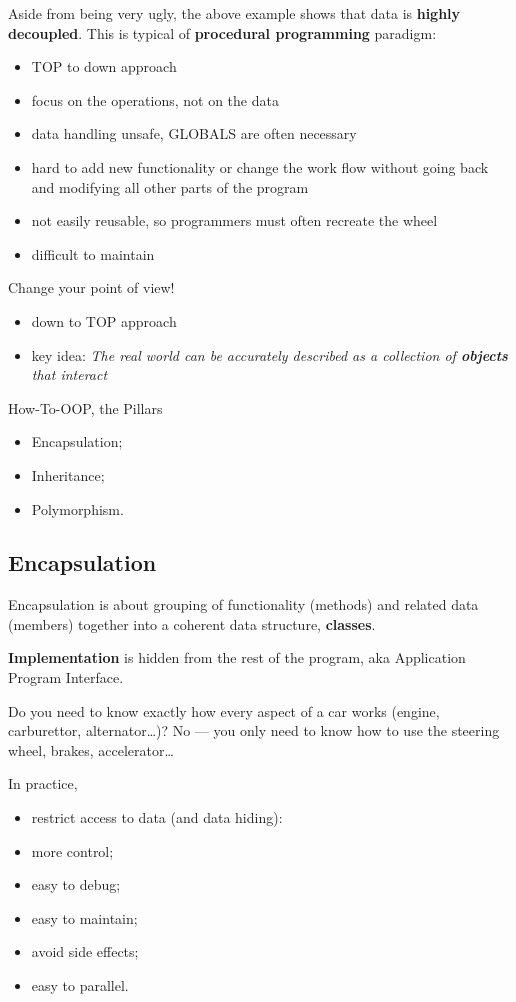 \documentclass[11pt]{book} %
\begin{document}
Aside from being very ugly, the above example shows that data is \textbf{highly decoupled}. This is typical of \textbf{procedural programming} paradigm:
\begin{itemize}
\item TOP to down approach
\item focus on the operations, not on the data
\item data handling unsafe, GLOBALS are often necessary
\item hard to add new functionality or change the work flow without going back and modifying all other parts of the program
\item not easily reusable, so programmers must often recreate the wheel
\item difficult to maintain
\end{itemize}

Change your point of view!
\begin{itemize}
\item down to TOP approach
\item key idea: \emph{The real world can be accurately described as a collection of \textbf{objects} that interact}
\end{itemize}

How-To-OOP, the Pillars
\begin{itemize}
\item Encapsulation;
\item Inheritance;
\item Polymorphism.
\end{itemize}

\subsection{Encapsulation}
Encapsulation is about grouping of functionality (methods) and related data (members) together into a coherent data structure, \textbf{classes}.

\textbf{Implementation} is hidden from the rest of the program, aka Application Program Interface.

Do you need to know exactly how every aspect of a car works (engine, carburettor, alternator…)? No --- you only need to know how to use the steering wheel, brakes, accelerator…

In practice,
\begin{itemize}
\item restrict access to data (and data hiding):
\item more control;
\item easy to debug;
\item easy to maintain;
\item avoid side effects;
\item easy to parallel.
\end{itemize}
\end{document}
